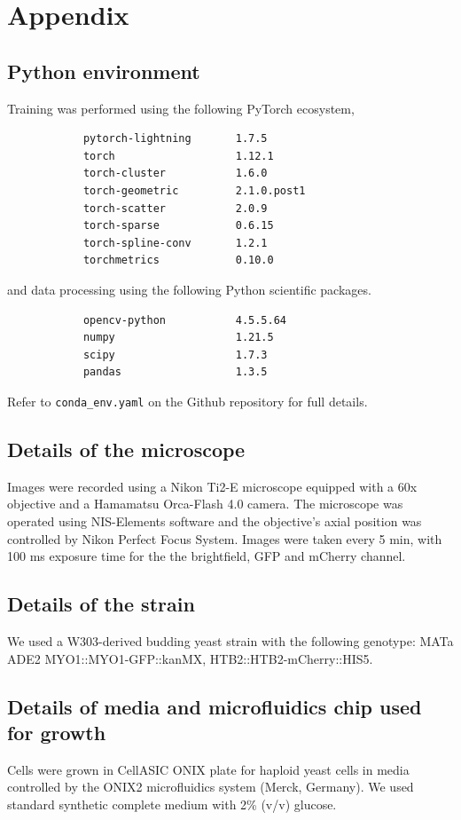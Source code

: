 \documentclass[10pt,conference,compsocconf,a4paper]{IEEEtran}
\begin{document}

\newpage



\newpage

\section{Appendix}

	\subsection{Python environment}

		Training was performed using the following PyTorch ecosystem,
		\begin{verbatim}
			pytorch-lightning       1.7.5
			torch                   1.12.1
			torch-cluster           1.6.0
			torch-geometric         2.1.0.post1
			torch-scatter           2.0.9
			torch-sparse            0.6.15
			torch-spline-conv       1.2.1
			torchmetrics            0.10.0
		\end{verbatim}
		and data processing using the following Python scientific packages.
		\begin{verbatim}
			opencv-python           4.5.5.64
			numpy                   1.21.5
			scipy                   1.7.3
			pandas                  1.3.5
		\end{verbatim}

		Refer to \texttt{conda\_env.yaml} on the Github repository for full details.

	\subsection{Details of the microscope}
		
		Images were recorded using a Nikon Ti2-E microscope equipped with a 60x objective and a Hamamatsu Orca-Flash 4.0 camera.
		The microscope was operated using NIS-Elements software and the objective's axial position was controlled by Nikon
		Perfect Focus System. Images were taken every 5 min, with 100 ms exposure time for the the brightfield, GFP and mCherry
		channel.

	\subsection{Details of the strain}

		We used a W303-derived budding yeast strain with the following genotype: MATa ADE2 MYO1::MYO1-GFP::kanMX, 
		HTB2::HTB2-mCherry::HIS5.

	\subsection{Details of media and microfluidics chip used for growth}

		Cells were grown in CellASIC ONIX plate for haploid yeast cells in media controlled by the ONIX2 microfluidics system
		(Merck, Germany). We used standard synthetic complete medium with 2\% (v/v) glucose.
\end{document}

